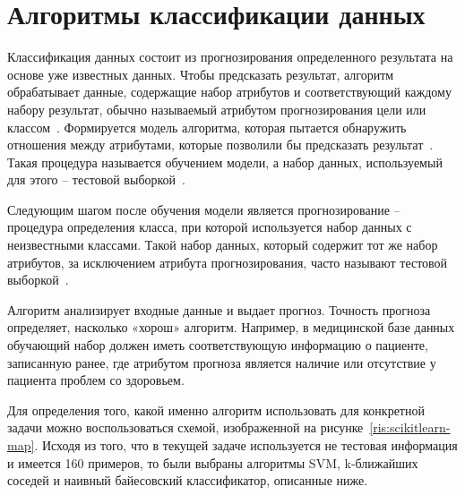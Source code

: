 \newpage
\section{\Large Алгоритмы классификации данных}
Классификация данных состоит из прогнозирования определенного результата на основе уже известных данных. Чтобы предсказать результат, алгоритм обрабатывает данные, содержащие набор атрибутов и соответствующий каждому набору результат, обычно называемый атрибутом прогнозирования цели или классом~\cite{hetal2016}. Формируется модель алгоритма, которая пытается обнаружить отношения между атрибутами, которые позволили бы предсказать результат~\cite{kumbhar}. Такая процедура называется обучением модели, а набор данных, используемый для этого -- тестовой выборкой~\cite{Mirmozaffari}.
\par
Следующим шагом после обучения модели является прогнозирование -- процедура определения класса, при которой используется набор данных с неизвестными классами. Такой набор данных, который содержит тот же набор атрибутов, за исключением атрибута прогнозирования, часто называют тестовой выборкой~\cite{tprogeralgorithms}.
\par
Алгоритм анализирует входные данные и выдает прогноз. Точность прогноза определяет, насколько «хорош» алгоритм. Например, в медицинской базе данных обучающий набор должен иметь соответствующую информацию о пациенте, записанную ранее, где атрибутом прогноза является наличие или отсутствие у пациента проблем со здоровьем.
\par
Для определения того, какой именно алгоритм использовать для конкретной задачи можно воспользоваться схемой, изображенной на рисунке~\ref{ris:scikitlearn-map}. Исходя из того, что в текущей задаче используется не тестовая информация и имеется 160 примеров, то были выбраны алгоритмы SVM, k-ближайших соседей и наивный байесовский классификатор, описанные ниже.
\\
